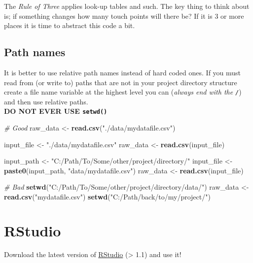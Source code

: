 \documentclass[]{book}
\newenvironment{Shaded}{\begin{snugshade}}{\end{snugshade}}
\newcommand{\KeywordTok}[1]{\textcolor[rgb]{0.13,0.29,0.53}{\textbf{#1}}}
\newcommand{\StringTok}[1]{\textcolor[rgb]{0.31,0.60,0.02}{#1}}
\newcommand{\CommentTok}[1]{\textcolor[rgb]{0.56,0.35,0.01}{\textit{#1}}}
\newcommand{\NormalTok}[1]{#1}
\theoremstyle{definition}
\theoremstyle{definition}
\theoremstyle{definition}
\theoremstyle{remark}
\begin{document}
The \emph{Rule of Three} applies look-up tables and such. The key thing
to think about is; if something changes how many touch points will there
be? If it is 3 or more places it is time to abstract this code a bit.

\subsection{Path names}\label{path-names}

It is better to use relative path names instead of hard coded ones. If
you must read from (or write to) paths that are not in your project
directory structure create a file name variable at the highest level you
can (\emph{always end with the \texttt{/}}) and then use relative
paths.\\
\textbf{DO NOT EVER USE \texttt{setwd()}}

\begin{Shaded}
\begin{Highlighting}[]
\CommentTok{# Good}
\NormalTok{raw_data <-}\StringTok{ }\KeywordTok{read.csv}\NormalTok{(}\StringTok{"./data/mydatafile.csv"}\NormalTok{) }

\NormalTok{input_file <-}\StringTok{ "./data/mydatafile.csv"}
\NormalTok{raw_data <-}\StringTok{ }\KeywordTok{read.csv}\NormalTok{(input_file)  }

\NormalTok{input_path <-}\StringTok{ "C:/Path/To/Some/other/project/directory/"}
\NormalTok{input_file <-}\StringTok{ }\KeywordTok{paste0}\NormalTok{(input_path, }\StringTok{"data/mydatafile.csv"}\NormalTok{)}
\NormalTok{raw_data <-}\StringTok{ }\KeywordTok{read.csv}\NormalTok{(input_file)}

\CommentTok{# Bad}
\KeywordTok{setwd}\NormalTok{(}\StringTok{"C:/Path/To/Some/other/project/directory/data/"}\NormalTok{)}
\NormalTok{raw_data <-}\StringTok{ }\KeywordTok{read.csv}\NormalTok{(}\StringTok{"mydatafile.csv"}\NormalTok{)}
\KeywordTok{setwd}\NormalTok{(}\StringTok{"C:/Path/back/to/my/project/"}\NormalTok{)}
\end{Highlighting}
\end{Shaded}

\section{RStudio}\label{rstudio}

Download the latest version of
\href{https://www.rstudio.com/products/rstudio/download/\#download}{RStudio}
(\textgreater{} 1.1) and use it!
\end{document}
